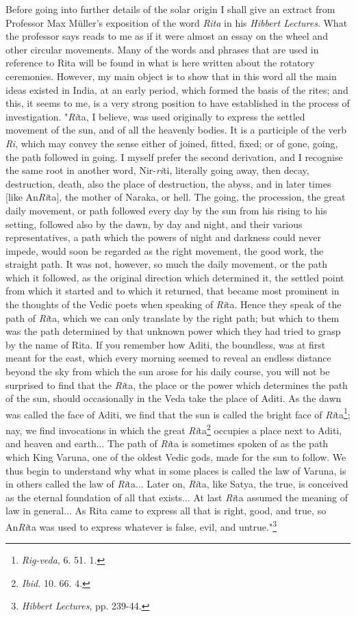 \documentclass[a4paper, 11pt, oneside, polutonikogreek, english]{article}
\begin{document}
Before going into further details of the solar origin I shall give an extract from Professor Max Müller's exposition of the word \emph{Rita} in his \emph{Hibbert Lectures}. What the professor says reads to me as if it were almost an essay on the wheel and other circular movements. Many of the words and phrases that are used in reference to Rita will be found in what is here written about the rotatory ceremonies. However, my main object is to show that in this word all the main ideas existed in India, at an early period, which formed the basis of the rites; and this, it seems to me, is a very strong position to have established in the process of investigation. "\emph{Ri}ta, I believe, was used originally to express the settled movement of the sun, and of all the heavenly bodies. It is a participle of the verb \emph{Ri}, which may convey the sense either of joined, fitted, fixed; or of gone, going, the path followed in going. I myself prefer the second derivation, and I recognise the same root in another word, Nir-\emph{ri}ti, literally going away, then decay, destruction, death, also the place of destruction, the abyss, and in later times [like An\emph{Ri}ta], the mother of Naraka, or hell. The going, the procession, the great daily movement, or path followed every day by the sun from his rising to his setting, followed also by the dawn, by day and night, and their various representatives, a path which the powers of night and darkness could never impede, would soon be regarded as the right movement, the good work, the straight path. It was not, however, so much the daily movement, or the path which it followed, as the original direction which determined it, the settled point from which it started and to which it returned, that became most prominent in the thoughts of the Vedic poets when speaking of \emph{Ri}ta. Hence they speak of the path of \emph{Ri}ta, which we can only translate by the right path; but which to them was the path determined by that unknown power which they had tried to grasp by the name of Rita. If you remember how Aditi, the boundless, was at first meant for the east, which every morning seemed to reveal an endless distance beyond the sky from which the sun arose for his daily course, you will not be surprised to find that the \emph{Ri}ta, the place or the power which determines the path of the sun, should occasionally in the Veda take the place of Aditi. As the dawn was called the face of Aditi, we find that the sun is called the bright face of \emph{Ri}ta\footnote{\emph{Rig-veda}, 6. 51. 1.}; nay, we find invocations in which the great \emph{Ri}ta\footnote{\emph{Ibid.} 10. 66. 4.} occupies a place next to Aditi, and heaven and earth... The path of \emph{Ri}ta is sometimes spoken of as the path which King Varuna, one of the oldest Vedic gods, made for the sun to follow. We thus begin to understand why what in some places is called the law of Varuna, is in others called the law of \emph{Ri}ta... Later on, \emph{Ri}ta, like Satya, the true, is conceived as the eternal foundation of all that exists... At last \emph{Ri}ta assumed the meaning of law in general... As Rita came to express all that is right, good, and true, so An\emph{Ri}ta was used to express whatever is false, evil, and untrue."\footnote{\emph{Hibbert Lectures}, pp. 239-44.}
\end{document}
